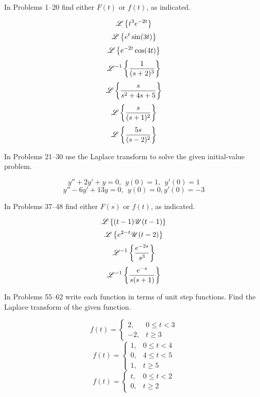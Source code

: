 \documentclass[chapter=7,section=3]{math252homework}
\begin{document}
In Problems 1--20 find either $F(t)$ or $f(t)$, as indicated.
\begin{problems}[start=3]
	\problem \[ \mathscr{L}\left\{ t^{3}e^{-2t} \right\} \]						%
	\setcounter{problemsi}{6}
	\problem \[ \mathscr{L}\left\{ e^{t}\sin(3t) \right\} \]						%
	\problem \[ \mathscr{L}\left\{ e^{-2t}\cos(4t) \right\} \]						%
	\setcounter{problemsi}{10}
	\problem \[ \mathscr{L}^{-1}\left\{ \frac{1}{(s+2)^{3}} \right\} \]			%
	\setcounter{problemsi}{14}
	\problem \[ \mathscr{L}\left\{ \frac{s}{s^{2} + 4s + 5} \right\} \]			%
	\setcounter{problemsi}{16}
	\problem \[ \mathscr{L}\left\{ \frac{s}{(s+1)^{2}} \right\} \]					%
	\problem \[ \mathscr{L}\left\{ \frac{5s}{(s-2)^{2}} \right\} \]				%
\end{problems}

In Problems 21--30 use the Laplace transform to solve the given initial-value problem.
\begin{problems}[start=23]
	\problem \[ y'' + 2y' + y = 0,\ \ y(0)=1,\ \ y'(0)=1 \]			%
	\setcounter{problemsi}{26}
	\problem \[ y'' - 6y' + 13y = 0,\ \ y(0)=0, y'(0)=-3 \]			%
\end{problems}

In Problems 37--48 find either $F(s)$ or $f(t)$, as indicated.
\begin{problems}[start=37]
	\problem \[ \mathscr{L}\left\{ (t-1)\mathscr{U}(t-1) \right\} \] 			%
	\problem \[ \mathscr{L}\left\{ e^{2-t}\mathscr{U}(t-2) \right\} \]			%
	\setcounter{problemsi}{42}
	\problem \[ \mathscr{L}^{-1}\left\{ \frac{e^{-2s}}{s^{3}} \right\} \]			%
	\setcounter{problemsi}{46}
	\problem \[ \mathscr{L}^{-1}\left\{ \frac{e^{-s}}{s(s+1)} \right\} \]			%
\end{problems}

In Problems 55--62 write each function in terms of unit step functions.
Find the Laplace transform of the given function.
\begin{problems}[start=55]
	\problem \[ f(t) = \left\{ \begin{array}{lr}
		2, & 0 \leq t < 3 \\
		-2, & t \geq 3
	\end{array} \right. \]			%
	\problem \[ f(t) = \left\{ \begin{array}{lr}
		1, & 0 \leq t < 4 \\
		0, & 4 \leq t < 5 \\
		1, & t \geq 5
	\end{array} \right. \]			%
	\setcounter{problemsi}{58}
	\problem \[ f(t) = \left\{ \begin{array}{lr}
		t, & 0 \leq t < 2 \\
		0, & t \geq 2
	\end{array} \right. \]			%
\end{problems}
\end{document}
